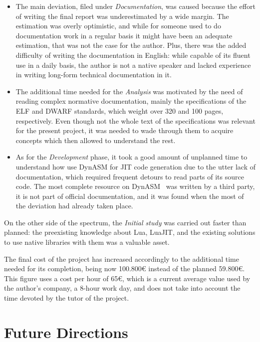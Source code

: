 \begin{itemize}

	\item The main deviation, filed under \emph{Documentation}, was caused
	because the effort of writing the final report was underestimated by
	a wide margin. The estimation was overly optimistic, and while for someone
	used to do documentation work in a regular basis it might have been an
	adequate estimation, that was not the case for the author. Plus, there was
	the added difficulty of writing the documentation in English: while
	capable of its fluent use in a daily basis, the author is not a native
	speaker and lacked experience in writing long-form technical documentation
	in it.

	\item The additional time needed for the \emph{Analysis} was motivated by
	the need of reading complex normative documentation, mainly the
	specifications of the \gls{ELF} and \gls{DWARF} standards, which weight
	over 320 and 100 pages, respectively. Even though not the whole text of
	the specifications was relevant for the present project, it was needed to
	wade through them to acquire concepts which then allowed to understand the
	rest.

	\item As for the \emph{Development} phase, it took a good amount of
	unplanned time to understand how use DynASM for JIT code generation due to
	the utter lack of documentation, which required frequent detours to read
	parts of its source code. The most complete resource on
	DynASM~\cite{unofficial-dasm-doc} was written by a third party, it is not
	part of official documentation, and it was found when the most of the
	deviation had already taken place.

\end{itemize}


On the other side of the spectrum, the \emph{Initial study} was carried out
faster than planned: the preexisting knowledge about Lua, LuaJIT, and the
existing solutions to use native libraries with them was a valuable asset.

The final cost of the project has increased accordingly to the additional time
needed for its completion, being now 100.800€ instead of the planned 59.800€.
This figure uses a cost per hour of 65€, which is a current average value
used by the author's company, a 8-hour work day, and does not take into
account the time devoted by the tutor of the project.


\section{Future Directions}

